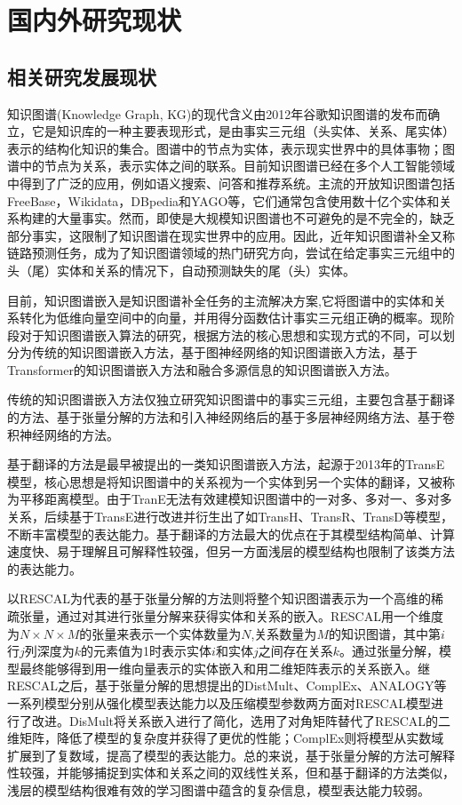 \section{国内外研究现状}

\subsection{相关研究发展现状}
知识图谱(Knowledge Graph, KG)的现代含义由2012年谷歌知识图谱的发布而确立，它是知识库的一种主要表现形式，是由事实三元组（头实体、关系、尾实体）表示的结构化知识的集合。图谱中的节点为实体，表示现实世界中的具体事物；图谱中的节点为关系，表示实体之间的联系。目前知识图谱已经在多个人工智能领域中得到了广泛的应用，例如语义搜索、问答和推荐系统。主流的开放知识图谱包括FreeBase，Wikidata，DBpedia和YAGO等，它们通常包含使用数十亿个实体和关系构建的大量事实。然而，即使是大规模知识图谱也不可避免的是不完全的，缺乏部分事实，这限制了知识图谱在现实世界中的应用。因此，近年知识图谱补全又称链路预测任务，成为了知识图谱领域的热门研究方向，尝试在给定事实三元组中的头（尾）实体和关系的情况下，自动预测缺失的尾（头）实体。

目前，知识图谱嵌入是知识图谱补全任务的主流解决方案,它将图谱中的实体和关系转化为低维向量空间中的向量，并用得分函数估计事实三元组正确的概率。现阶段对于知识图谱嵌入算法的研究，根据方法的核心思想和实现方式的不同，可以划分为传统的知识图谱嵌入方法，基于图神经网络的知识图谱嵌入方法，基于Transformer的知识图谱嵌入方法和融合多源信息的知识图谱嵌入方法。

传统的知识图谱嵌入方法仅独立研究知识图谱中的事实三元组，主要包含基于翻译的方法、基于张量分解的方法和引入神经网络后的基于多层神经网络方法、基于卷积神经网络的方法。

基于翻译的方法是最早被提出的一类知识图谱嵌入方法，起源于2013年的TransE模型，核心思想是将知识图谱中的关系视为一个实体到另一个实体的翻译，又被称为平移距离模型。由于TranE无法有效建模知识图谱中的一对多、多对一、多对多关系，后续基于TransE进行改进并衍生出了如TransH、TransR、TransD等模型，不断丰富模型的表达能力。基于翻译的方法最大的优点在于其模型结构简单、计算速度快、易于理解且可解释性较强，但另一方面浅层的模型结构也限制了该类方法的表达能力。

以RESCAL为代表的基于张量分解的方法则将整个知识图谱表示为一个高维的稀疏张量，通过对其进行张量分解来获得实体和关系的嵌入。RESCAL用一个维度为$N\times N\times M$的张量来表示一个实体数量为$N$,关系数量为$M$的知识图谱，其中第$i$行$j$列深度为$k$的元素值为1时表示实体$i$和实体$j$之间存在关系$k$。通过张量分解，模型最终能够得到用一维向量表示的实体嵌入和用二维矩阵表示的关系嵌入。继RESCAL之后，基于张量分解的思想提出的DistMult、ComplEx、ANALOGY等一系列模型分别从强化模型表达能力以及压缩模型参数两方面对RESCAL模型进行了改进。DisMult将关系嵌入进行了简化，选用了对角矩阵替代了RESCAL的二维矩阵，降低了模型的复杂度并获得了更优的性能；ComplEx则将模型从实数域扩展到了复数域，提高了模型的表达能力。总的来说，基于张量分解的方法可解释性较强，并能够捕捉到实体和关系之间的双线性关系，但和基于翻译的方法类似，浅层的模型结构很难有效的学习图谱中蕴含的复杂信息，模型表达能力较弱。

